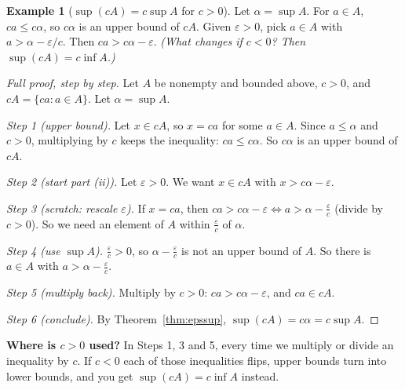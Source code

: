 \documentclass[11pt]{article}
\theoremstyle{definition}
\newtheorem{ex}[defn]{Example}
\newcommand{\eps}{\varepsilon}
\newcommand{\key}[1]{\textcolor{red!70!black}{\textbf{#1}}}
\begin{document}
\begin{ex}[$\sup(cA)=c\sup A$ for $c>0$]
Let $\alpha=\sup A$. For $a\in A$, $ca\le c\alpha$, so $c\alpha$ is an
upper bound of $cA$. Given $\eps>0$, pick $a\in A$ with
$a>\alpha-\eps/c$. Then $ca>c\alpha-\eps$. \emph{(What changes if $c<0$?
Then $\sup(cA)=c\inf A$.)}

\begin{proof}[Full proof, step by step]
Let $A$ be nonempty and bounded above, $c>0$, and
$cA=\{ca:a\in A\}$. Let $\alpha=\sup A$.

\emph{Step 1 (upper bound).} Let $x\in cA$, so $x=ca$ for some $a\in A$.
Since $a\le\alpha$ and $c>0$, multiplying by $c$ keeps the inequality:
$ca\le c\alpha$. So $c\alpha$ is an upper bound of $cA$.

\emph{Step 2 (start part (ii)).} Let $\eps>0$. We want $x\in cA$ with
$x>c\alpha-\eps$.

\emph{Step 3 (scratch: rescale $\eps$).} If $x=ca$, then
$ca>c\alpha-\eps\iff a>\alpha-\frac\eps c$ (divide by $c>0$). So we need
an element of $A$ within $\frac\eps c$ of $\alpha$.

\emph{Step 4 (use $\sup A$).} $\frac\eps c>0$, so
$\alpha-\frac\eps c$ is not an upper bound of $A$. So there is $a\in A$
with $a>\alpha-\frac\eps c$.

\emph{Step 5 (multiply back).} Multiply by $c>0$:
$ca>c\alpha-\eps$, and $ca\in cA$.

\emph{Step 6 (conclude).} By Theorem~\ref{thm:epssup},
$\sup(cA)=c\alpha=c\sup A$.
\end{proof}
\noindent\key{Where is $c>0$ used?} In Steps 1, 3 and 5, every time we
multiply or divide an inequality by $c$. If $c<0$ each of those
inequalities flips, upper bounds turn into lower bounds, and you get
$\sup(cA)=c\inf A$ instead.
\end{ex}
\end{document}

